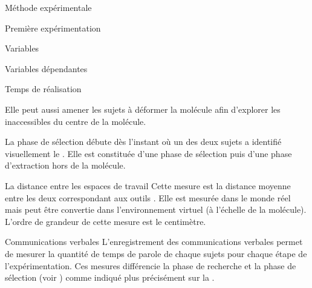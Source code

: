 \documentclass[myfrancais]{mythesis}
\begin{document}
\begin{mychapter}{Méthode expérimentale}
\begin{mysection}{Première expérimentation}
\begin{mysubsection}{Variables}
\begin{mysubsubsection}{Variables dépendantes}
\begin{myparagraph}{ Temps de réalisation}
\begin{description}
								Elle peut aussi amener les sujets à déformer la molécule afin d'explorer les  inaccessibles du centre de la molécule.
							\item[La sélection] La phase de sélection débute dès l'instant où un des deux sujets a identifié visuellement le .
								Elle est constituée d'une phase de sélection puis d'une phase d'extraction hors de la molécule.
						\end{description}
					\end{myparagraph}
					\begin{myparagraph}{ La distance entre les espaces de travail}
						Cette mesure est la distance moyenne entre les deux  correspondant aux outils .
						Elle est mesurée dans le monde réel mais peut être convertie dans l'environnement virtuel (à l'échelle de la molécule).
						L'ordre de grandeur de cette mesure est le centimètre.
					\end{myparagraph}
					\begin{myparagraph}{ Communications verbales}
						L'enregistrement des communications verbales permet de mesurer la quantité de temps de parole de chaque sujets pour chaque étape de l'expérimentation.
						Ces mesures différencie la phase de recherche et la phase de sélection (voir ) comme indiqué plus précisément sur la .


\end{myparagraph}
\end{mysubsubsection}
\end{mysubsection}
\end{mysection}
\end{mychapter}
\end{document}
